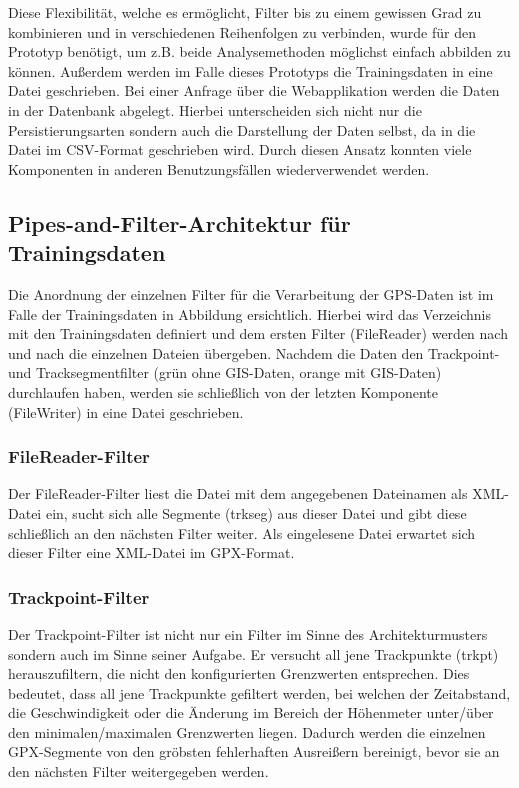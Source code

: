 Diese Flexibilität, welche es ermöglicht, Filter bis zu einem gewissen Grad zu kombinieren und in verschiedenen Reihenfolgen zu verbinden, wurde für den Prototyp benötigt, um z.B. beide Analysemethoden möglichst einfach abbilden zu können. Außerdem werden im Falle dieses Prototyps die Trainingsdaten in eine Datei geschrieben. Bei einer Anfrage über die Webapplikation werden die Daten in der Datenbank abgelegt. Hierbei unterscheiden sich nicht nur die Persistierungsarten sondern auch die Darstellung der Daten selbst, da in die Datei im CSV-Format geschrieben wird. Durch diesen Ansatz konnten viele Komponenten in anderen Benutzungsfällen wiederverwendet werden.

\subsection{Pipes-and-Filter-Architektur für Trainingsdaten}
Die Anordnung der einzelnen Filter für die Verarbeitung der GPS-Daten ist im Falle der Trainingsdaten in Abbildung  ersichtlich. Hierbei wird das Verzeichnis mit den Trainingsdaten definiert und dem ersten Filter (FileReader) werden nach und nach die einzelnen Dateien übergeben. Nachdem die Daten den Trackpoint- und Tracksegmentfilter (grün ohne GIS-Daten, orange mit GIS-Daten) durchlaufen haben, werden sie schließlich von der letzten Komponente (FileWriter) in eine Datei geschrieben.


\subsubsection{FileReader-Filter}
Der FileReader-Filter liest die Datei mit dem angegebenen Dateinamen als XML-Datei ein, sucht sich alle Segmente (trkseg) aus dieser Datei und gibt diese schließlich an den nächsten Filter weiter. Als eingelesene Datei erwartet sich dieser Filter eine XML-Datei im GPX-Format.

\subsubsection{Trackpoint-Filter}
Der Trackpoint-Filter ist nicht nur ein Filter im Sinne des Architekturmusters sondern auch im Sinne seiner Aufgabe. Er versucht all jene Trackpunkte (trkpt) herauszufiltern, die nicht den konfigurierten Grenzwerten entsprechen. Dies bedeutet, dass all jene Trackpunkte gefiltert werden, bei welchen der Zeitabstand, die Geschwindigkeit oder die Änderung im Bereich der Höhenmeter unter/über den minimalen/maximalen Grenzwerten liegen. Dadurch werden die einzelnen GPX-Segmente von den gröbsten fehlerhaften Ausreißern bereinigt, bevor sie an den nächsten Filter weitergegeben werden.

